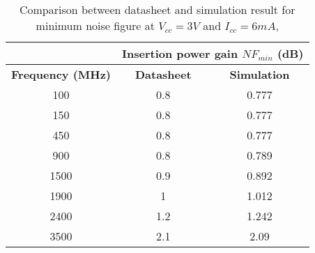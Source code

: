 \begin{table}[H]
\centering
\caption{Comparison between datasheet and simulation result for minimum noise figure at  $V_{cc} = 3V$ and $I_{cc} = 6mA$,}
\label{table:2}
\begin{tabular}{|c|c|c|}
\hline
\textbf{}                & \multicolumn{2}{c|}{\textbf{Insertion power gain $NF_{min}$ (dB)}} \\ \hline
\textbf{Frequency (MHz)} & \textbf{Datasheet}              & \textbf{Simulation}              \\ \hline
100                      & 0.8                             & 0.777                            \\ \hline
150                      & 0.8                             & 0.777                            \\ \hline
450                      & 0.8                             & 0.777                            \\ \hline
900                      & 0.8                             & 0.789                            \\ \hline
1500                     & 0.9                             & 0.892                            \\ \hline
1900                     & 1                               & 1.012                            \\ \hline
2400                     & 1.2                             & 1.242                            \\ \hline
3500                     & 2.1                             & 2.09                             \\ \hline
\end{tabular}
\end{table}